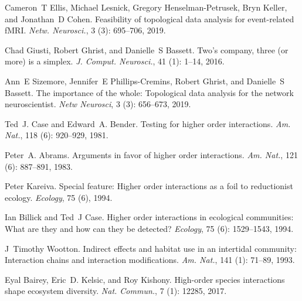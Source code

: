 Cameron~T Ellis, Michael Lesnick, Gregory {Henselman-Petrusek}, Bryn Keller,
and Jonathan~D Cohen.
\newblock Feasibility of topological data analysis for event-related {{fMRI}}.
\newblock \emph{Netw. Neurosci.}, 3 (3): 695--706, 2019.

Chad Giusti, Robert Ghrist, and Danielle~S Bassett.
\newblock Two's company, three (or more) is a simplex.
\newblock \emph{J. Comput. Neurosci.}, 41 (1): 1--14, 2016.

Ann~E Sizemore, Jennifer~E {Phillips-Cremins}, Robert Ghrist, and Danielle~S
Bassett.
\newblock The importance of the whole: Topological data analysis for the
network neuroscientist.
\newblock \emph{Netw Neurosci}, 3 (3): 656--673, 2019.

Ted~J. Case and Edward~A. Bender.
\newblock Testing for higher order interactions.
\newblock \emph{Am. Nat.}, 118 (6): 920--929, 1981.

Peter~A. Abrams.
\newblock Arguments in favor of higher order interactions.
\newblock \emph{Am. Nat.}, 121 (6): 887--891, 1983.

Peter Kareiva.
\newblock Special feature: {{Higher}} order interactions as a foil to
reductionist ecology.
\newblock \emph{Ecology}, 75 (6), 1994.

Ian Billick and Ted~J Case.
\newblock Higher order interactions in ecological communities: What are they
and how can they be detected?
\newblock \emph{Ecology}, 75 (6): 1529--1543, 1994.

J~Timothy Wootton.
\newblock Indirect effects and habitat use in an intertidal community:
Interaction chains and interaction modifications.
\newblock \emph{Am. Nat.}, 141 (1): 71--89, 1993.

Eyal Bairey, Eric~D. Kelsic, and Roy Kishony.
\newblock High-order species interactions shape ecosystem diversity.
\newblock \emph{Nat. Commun.}, 7 (1): 12285, 2017.

